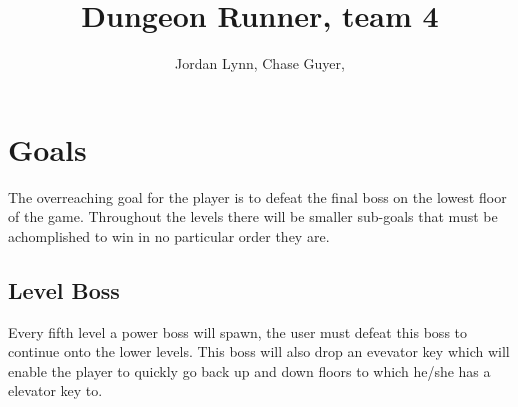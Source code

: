 \documentclass[11pt]{article}
\title{Dungeon Runner, team 4}
\author{Jordan Lynn, Chase Guyer, }
\begin{document}
    \maketitle

    \section{Goals}
    The overreaching goal for the player is to defeat the final boss on the lowest floor of the game. Throughout the levels there will be smaller sub-goals that must be achomplished to win in no particular order they are.
        \subsection{Level Boss}
            Every fifth level a power boss will spawn, the user must defeat this boss to continue onto the lower levels. This boss will also drop an evevator key which will enable the player to quickly go back up and down floors to which he/she has a elevator key to.
    
    \section{}
\end{document}
